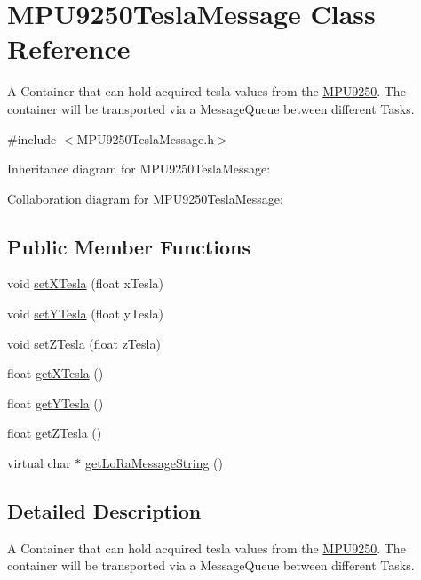 \hypertarget{class_m_p_u9250_tesla_message}{}\section{M\+P\+U9250\+Tesla\+Message Class Reference}
\label{class_m_p_u9250_tesla_message}


A Container that can hold acquired tesla values from the \hyperlink{class_m_p_u9250}{M\+P\+U9250}. The container will be transported via a Message\+Queue between different Tasks.  




{\ttfamily \#include $<$M\+P\+U9250\+Tesla\+Message.\+h$>$}



Inheritance diagram for M\+P\+U9250\+Tesla\+Message\+:


Collaboration diagram for M\+P\+U9250\+Tesla\+Message\+:
\subsection*{Public Member Functions}
\begin{DoxyCompactItemize}
\item 
void \hyperlink{class_m_p_u9250_tesla_message_adfc6c429493adc8f85bb55c7227bbea3}{set\+X\+Tesla} (float x\+Tesla)
\item 
void \hyperlink{class_m_p_u9250_tesla_message_a34206e359ac0da0ccf587cdc0686645b}{set\+Y\+Tesla} (float y\+Tesla)
\item 
void \hyperlink{class_m_p_u9250_tesla_message_a34bce373aceb8a05a2534979a379e806}{set\+Z\+Tesla} (float z\+Tesla)
\item 
float \hyperlink{class_m_p_u9250_tesla_message_a422c33f54702cdbbf965d581e76b6ef7}{get\+X\+Tesla} ()
\item 
float \hyperlink{class_m_p_u9250_tesla_message_afa874be8012a03508a648f3484ab5c3e}{get\+Y\+Tesla} ()
\item 
float \hyperlink{class_m_p_u9250_tesla_message_a2ab8e8dc6dd9e4463dcc9f2f6aa7d671}{get\+Z\+Tesla} ()
\item 
virtual char $\ast$ \hyperlink{class_m_p_u9250_tesla_message_ab26adfdc4c479d892ac7152f7e988229}{get\+Lo\+Ra\+Message\+String} ()
\end{DoxyCompactItemize}


\subsection{Detailed Description}
A Container that can hold acquired tesla values from the \hyperlink{class_m_p_u9250}{M\+P\+U9250}. The container will be transported via a Message\+Queue between different Tasks. 

